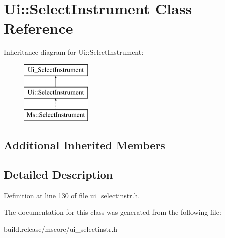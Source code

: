 \hypertarget{class_ui_1_1_select_instrument}{}\section{Ui\+:\+:Select\+Instrument Class Reference}
\label{class_ui_1_1_select_instrument}
Inheritance diagram for Ui\+:\+:Select\+Instrument\+:\begin{figure}[H]
\begin{center}
\leavevmode
\includegraphics[height=3.000000cm]{class_ui_1_1_select_instrument}
\end{center}
\end{figure}
\subsection*{Additional Inherited Members}


\subsection{Detailed Description}


Definition at line 130 of file ui\+\_\+selectinstr.\+h.



The documentation for this class was generated from the following file\+:\begin{DoxyCompactItemize}
\item 
build.\+release/mscore/ui\+\_\+selectinstr.\+h\end{DoxyCompactItemize}
